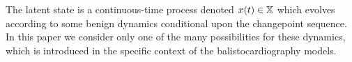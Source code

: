 \documentclass{article}
\begin{document}
The latent state is a continuous-time process denoted $x(t) \in \mathbb{X}$ which evolves according to some benign dynamics conditional upon the changepoint sequence. In this paper we consider only one of the many possibilities for these dynamics, which is introduced in the specific context of the balistocardiography models.



%
%
%
%
%
%
\end{document}
